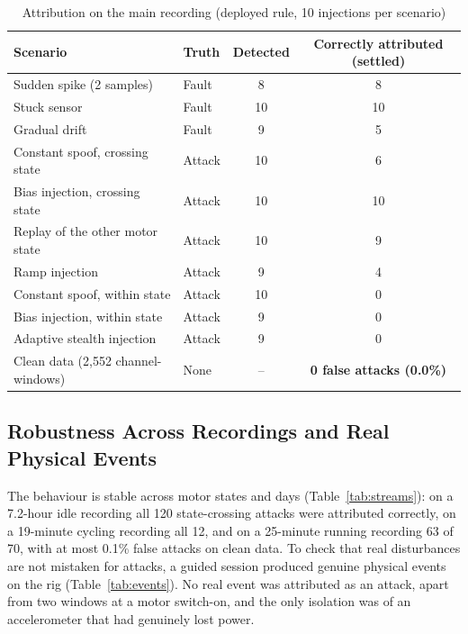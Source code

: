 \documentclass[11pt,a4paper]{article}
\begin{document}
\begin{table}[H]
\centering
\caption{Attribution on the main recording (deployed rule, 10 injections per scenario)}
\label{tab:attr}
\small
\begin{tabularx}{\textwidth}{@{}X l c c@{}}
\toprule
\textbf{Scenario} & \textbf{Truth} & \textbf{Detected} & \textbf{Correctly attributed (settled)} \\
\midrule
Sudden spike (2 samples) & Fault & 8 & 8 \\
Stuck sensor & Fault & 10 & 10 \\
Gradual drift & Fault & 9 & 5 \\
Constant spoof, crossing state & Attack & 10 & 6 \\
Bias injection, crossing state & Attack & 10 & 10 \\
Replay of the other motor state & Attack & 10 & 9 \\
Ramp injection & Attack & 9 & 4 \\
Constant spoof, within state & Attack & 10 & 0 \\
Bias injection, within state & Attack & 9 & 0 \\
Adaptive stealth injection & Attack & 9 & 0 \\
\midrule
Clean data (2,552 channel-windows) & None & -- & \textbf{0 false attacks (0.0\%)} \\
\bottomrule
\end{tabularx}
\end{table}

\subsection{Robustness Across Recordings and Real Physical Events}

The behaviour is stable across motor states and days (Table~\ref{tab:streams}): on a 7.2-hour idle recording all 120 state-crossing attacks were attributed correctly, on a 19-minute cycling recording all 12, and on a 25-minute running recording 63 of 70, with at most 0.1\% false attacks on clean data. To check that real disturbances are not mistaken for attacks, a guided session produced genuine physical events on the rig (Table~\ref{tab:events}). No real event was attributed as an attack, apart from two windows at a motor switch-on, and the only isolation was of an accelerometer that had genuinely lost power.
\end{document}
